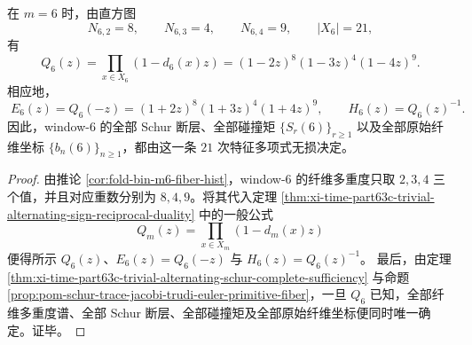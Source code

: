 \begin{corollary}\label{cor:xi-time-part63c-window6-schur-packet-locked-by-charpoly}
在 \(m=6\) 时，由直方图
\[
N_{6,2}=8,\qquad N_{6,3}=4,\qquad N_{6,4}=9,
\qquad |X_6|=21,
\]
有
\[
\boxed{\;
Q_6(z)=\prod_{x\in X_6}(1-d_6(x)z)
=(1-2z)^8(1-3z)^4(1-4z)^9.\;}
\]
相应地，
\[
\boxed{\;
E_6(z)=Q_6(-z)=(1+2z)^8(1+3z)^4(1+4z)^9,\qquad
H_6(z)=Q_6(z)^{-1}.\;}
\]
因此，window-\(6\) 的全部 Schur 断层、全部碰撞矩 \(\{S_r(6)\}_{r\ge 1}\) 以及全部原始纤维坐标 \(\{b_n(6)\}_{n\ge 1}\)，都由这一条 \(21\) 次特征多项式无损决定。
\end{corollary}
\begin{proof}
由推论 \ref{cor:fold-bin-m6-fiber-hist}，window-\(6\) 的纤维多重度只取 \(2,3,4\) 三个值，并且对应重数分别为 \(8,4,9\)。将其代入定理
\ref{thm:xi-time-part63c-trivial-alternating-sign-reciprocal-duality}
中的一般公式
\[
Q_m(z)=\prod_{x\in X_m}(1-d_m(x)z)
\]
便得所示 \(Q_6(z)\)、\(E_6(z)=Q_6(-z)\) 与 \(H_6(z)=Q_6(z)^{-1}\)。
最后，由定理
\ref{thm:xi-time-part63c-trivial-alternating-schur-complete-sufficiency}
与命题 \ref{prop:pom-schur-trace-jacobi-trudi-euler-primitive-fiber}，一旦 \(Q_6\) 已知，全部纤维多重度谱、全部 Schur 断层、全部碰撞矩及全部原始纤维坐标便同时唯一确定。证毕。
\end{proof}

\endinput
